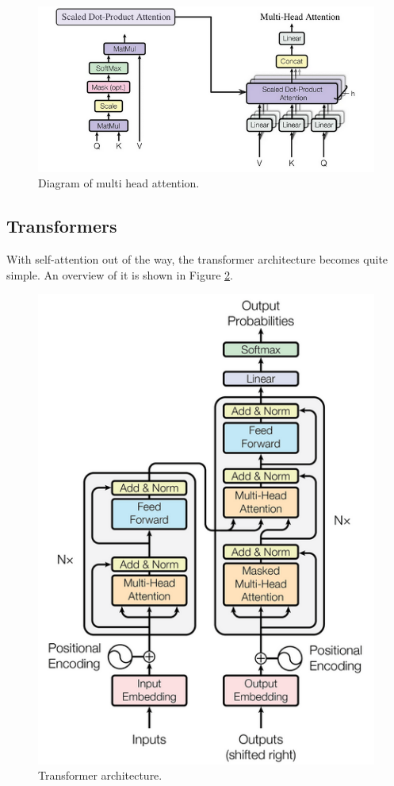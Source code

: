 \documentclass{article}
\begin{document}
      \begin{figure}[H]
        \centering 
        \includegraphics[scale=1.5]{img/10_Attention/multi_head_attention.png}
        \caption{Diagram of multi head attention. } 
        \label{fig:multi_head_attention}
      \end{figure}

  \subsection{Transformers} 

      With self-attention out of the way, the transformer architecture becomes quite simple. An overview of it is shown in Figure \ref{fig:transformer}. 

      \begin{figure}[H]
        \centering 
        \includegraphics[scale=1.0]{img/10_Attention/transformer.png}
        \caption{Transformer architecture. } 
        \label{fig:transformer}
      \end{figure}
\end{document}
